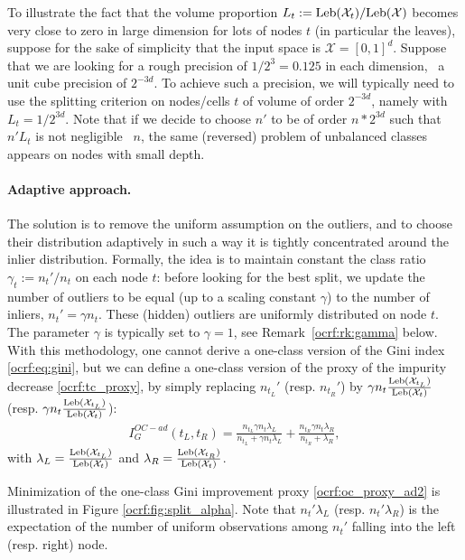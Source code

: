 %
\begin{remark}
To illustrate the fact that the volume proportion $L_t:=\text{Leb}(\mathcal{X}_t) / \text{Leb}(\mathcal{X})$ becomes very close to zero in large dimension for lots of nodes $t$ (in particular the leaves), suppose for the sake of simplicity that the input space is $\mathcal{X} = [0,1]^d$. Suppose that we are looking for a rough precision of $1/2^3=0.125$ in each dimension, \ie~a unit cube precision of $2^{-3d}$.
To achieve such a precision, we will typically need to use the splitting criterion on nodes/cells $t$ of volume of order $2^{-3d}$, namely with $L_t = 1/2^{3d}$.
Note that if we decide to choose $n'$ to be of order $n * 2^{3d}$ such that $n' L_{t}$ is not negligible \wrt~$n$, the same (reversed) problem of unbalanced classes appears on nodes with small depth. 
\end{remark}


\paragraph{Adaptive approach.}
The solution is to remove the uniform assumption on the outliers, and to choose their distribution adaptively in such a way it is tightly concentrated around the inlier distribution. Formally, the idea is to maintain constant the class ratio $\gamma_t := n_t' / n_t$ on each node $t$: before looking for the best split, we update the number of outliers to be equal (up to a scaling constant $\gamma$) to the number of inliers, $n_t' = \gamma n_t$. These (hidden) outliers are uniformly distributed on node $t$. The parameter $\gamma$ is typically set to $\gamma = 1$, see Remark~\ref{ocrf:rk:gamma} below.
With this methodology, one cannot derive a one-class version of the Gini index \eqref{ocrf:eq:gini}, but we can define a one-class version of the proxy of the impurity decrease \eqref{ocrf:tc_proxy}, by simply replacing $n_{t_L}'$ (resp. $n_{t_R}'$) by $\gamma n_t \frac{\text{Leb}(\mathcal{X}_{t_L})}{\text{Leb}(\mathcal{X}_{t})}$ (resp. $\gamma n_t \frac{\text{Leb}(\mathcal{X}_{t_L})}{\text{Leb}(\mathcal{X}_{t})}$):
\begin{align}
\label{ocrf:oc_proxy_ad2}
I_G^{OC-ad}(t_L, t_R)= \frac{n_{t_L} \gamma n_t \lambda_L}{n_{t_L} + \gamma n_t \lambda_L} + \frac{n_{t_R} \gamma n_t \lambda_R}{n_{t_R} + \lambda_R},
\end{align}
with $\lambda_L = \frac{\text{Leb}(\mathcal{X}_{t_L})}{\text{Leb}(\mathcal{X}_{t})}$ and $\lambda_R = \frac{\text{Leb}(\mathcal{X}_{t_R})}{\text{Leb}(\mathcal{X}_{t})}$.

Minimization of the one-class Gini improvement proxy \eqref{ocrf:oc_proxy_ad2} is illustrated in Figure \ref{ocrf:fig:split_alpha}. %
Note that $n_t'\lambda_L$ (resp. $n_t'\lambda_R$) is the expectation of the number of uniform observations among $n_t'$ falling into the left (resp. right) node.

